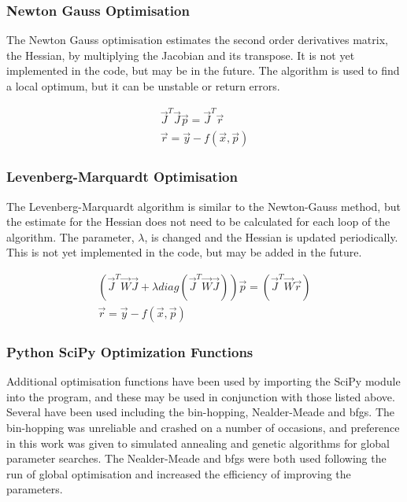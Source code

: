 \subsubsection{Newton Gauss Optimisation}

The Newton Gauss optimisation estimates the second order derivatives matrix, the Hessian, by multiplying the Jacobian and its transpose.  It is not yet implemented in the code, but may be in the future.  The algorithm is used to find a local optimum, but it can be unstable or return errors.

\begin{equation}
\begin{split}
\vec{J}^{T} \vec{J} \vec{p} = \vec{J}^{T} \vec{r} \\
\vec{r} = \vec{y} - f(\vec{x}, \vec{p})
\end{split}
\label{eq:eqNewtonGauss}
\end{equation}

\subsubsection{Levenberg-Marquardt Optimisation}

The Levenberg-Marquardt algorithm is similar to the Newton-Gauss method, but the estimate for the Hessian does not need to be calculated for each loop of the algorithm.  The parameter, $\lambda$, is changed and the Hessian is updated periodically.  This is not yet implemented in the code, but may be added in the future.

\begin{equation}
\begin{split}
\left( \vec{J}^{T} \vec{W} \vec{J} + \lambda diag\left( \vec{J}^{T} \vec{W} \vec{J} \right) \right) \vec{p} = {\left(\vec{J}^{T} \vec{W} \vec{r} \right)} \\
\vec{r} = \vec{y} - f(\vec{x}, \vec{p})
\end{split}
\label{eq:eqLevenbergMarquardt}
\end{equation}


\subsubsection{Python SciPy Optimization Functions}

Additional optimisation functions have been used by importing the SciPy module into the program, and these may be used in conjunction with those listed above.  Several have been used including the bin-hopping, Nealder-Meade and \acrshort{bfgs}.  The bin-hopping was unreliable and crashed on a number of occasions, and preference in this work was given to simulated annealing and genetic algorithms for global parameter searches.  The Nealder-Meade and \acrshort{bfgs} were both used following the run of global optimisation and increased the efficiency of improving the parameters.






